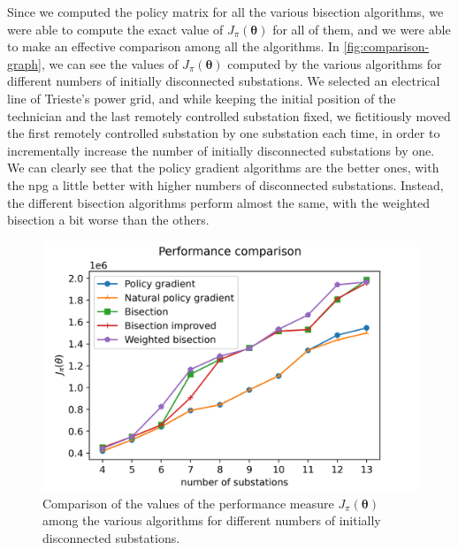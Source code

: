 Since we computed the policy matrix for all the various bisection algorithms, we were able to compute the exact value of $J_\pi (\boldsymbol \theta)$ for all of them, and we were able to make an effective comparison among all the algorithms. In \autoref{fig:comparison-graph}, we can see the values of $J_\pi(\boldsymbol \theta)$ computed by the various algorithms for different numbers of initially disconnected substations. We selected an electrical line of Trieste's power grid, and while keeping the initial position of the technician and the last remotely controlled substation fixed, we fictitiously moved the first remotely controlled substation by one substation each time, in order to incrementally increase the number of initially disconnected substations by one.
We can clearly see that the policy gradient algorithms are the better ones, with the \acrshort{npg} a little better with higher numbers of disconnected substations. Instead, the different bisection algorithms perform almost the same, with the weighted bisection a bit worse than the others.

\begin{figure}[bh]
    \centering
    \includegraphics[scale=0.8]{chapters/figures/comparison_graph.png}
    \caption{Comparison of the values of the performance measure $J_\pi (\boldsymbol \theta)$ among the various algorithms for different numbers of initially disconnected substations.}
    \label{fig:comparison-graph}
\end{figure}

